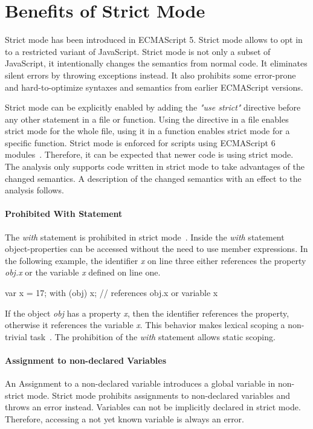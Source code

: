 \section{Benefits of Strict Mode}\label{sec:strict-mode}
Strict mode has been introduced in ECMAScript 5. Strict mode allows to opt in to a restricted variant of JavaScript. Strict mode is not only a subset of JavaScript, it intentionally changes the semantics from normal code. It eliminates silent errors by throwing exceptions instead. It also prohibits some error-prone and hard-to-optimize syntaxes and semantics from earlier ECMAScript versions. 

Strict mode can be explicitly enabled by adding the \textit{"use strict"} directive before any other statement in a file or function. Using the directive in a file enables strict mode for the whole file, using it in a function enables strict mode for a specific function. Strict mode is enforced for scripts using ECMAScript 6 modules~\cite[10.2.1]{Ecma2015}. Therefore, it can be expected that newer code is using strict mode. The analysis only supports code written in strict mode to take advantages of the changed semantics. A description of the changed semantics with an effect to the analysis follows.

\paragraph{Prohibited With Statement}
The \textit{with} statement is prohibited in strict mode~\cite[Annex C]{Ecma2015}. Inside the \textit{with} statement object-properties can be accessed without the need to use member expressions. In the following example, the identifier \textit{x} on line three either references the property \textit{obj.x} or the variable \textit{x} defined on line one.

\begin{javascriptcode}
var x = 17;
with (obj) {
	x; // references obj.x or variable x
}
\end{javascriptcode}

If the object \textit{obj} has a property \textit{x}, then the identifier references the property, otherwise it references the variable \textit{x}. This behavior makes lexical scoping a non-trivial task~\cite{JensenMollerThiemann2009}. The prohibition of the \textit{with} statement allows static scoping.

\paragraph{Assignment to non-declared Variables}
An Assignment to a non-declared variable introduces a global variable in non-strict mode. Strict mode prohibits assignments to non-declared variables and throws an error instead. Variables can not be implicitly declared in strict mode. Therefore, accessing a not yet known variable is always an error.